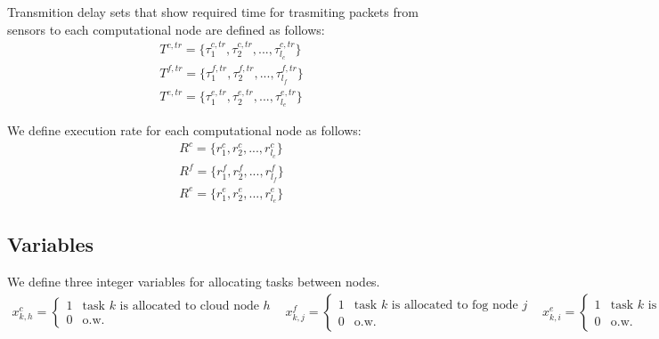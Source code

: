 \documentclass[conference]{IEEEtran}
\begin{document}
    Transmition delay sets that show required time for trasmiting packets
    from sensors to each computational node are defined as follows:
    \begin{subequations}
      \begin{align}
        T^{c,tr} = \{\tau_1^{c,tr}, \tau_2^{c,tr}, ..., \tau_{l_c}^{c,tr}\}\\
        T^{f,tr} = \{\tau_1^{f,tr}, \tau_2^{f,tr}, ..., \tau_{l_f}^{f,tr}\}\\
        T^{e,tr} = \{\tau_1^{e,tr}, \tau_2^{e,tr}, ..., \tau_{l_e}^{e,tr}\}
      \end{align}
    \end{subequations}

    We define execution rate for each computational node as follows:
    \begin{subequations}
      \begin{align}
        R^c = \{r_1^c, r_2^c, ..., r_{l_c}^c\}\\
        R^f = \{r_1^f, r_2^f, ..., r_{l_f}^f\}\\
        R^e = \{r_1^e, r_2^e, ..., r_{l_e}^e\}
      \end{align}
    \end{subequations}

    \subsection{Variables}

    We define three integer variables for allocating tasks between nodes.
    \begin{subequations}
      \begin{align}
      x_{k,h}^c =
      \begin{cases}
        1 & \text{task $k$ is allocated to cloud node $h$} \\
        0 & \text{o.w.}
     \end{cases}
     \end{align}

     \begin{align}
       x_{k,j}^f =
       \begin{cases}
         1 & \text{task $k$ is allocated to fog node $j$} \\
         0 & \text{o.w.}
      \end{cases}
     \end{align}

     \begin{align}
       x_{k,i}^e =
       \begin{cases}
         1 & \text{task $k$ is allocated to edge node $i$} \\
         0 & \text{o.w.}
      \end{cases}
     \end{align}

     \begin{align}
       \tau_k = \sum_{i=1}^{l_e}u_s^i \\
     \end{align}
    \end{subequations}
\end{document}
